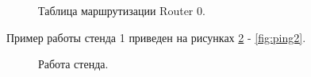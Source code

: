 \documentclass[a4paper,14pt]{article}
\begin{document}
\newpage
\begin{figure}[!h]
    \caption{Таблица маршрутизации Router 0.}
    \label{fig:table}
\end{figure}


Пример работы стенда 1 приведен на рисунках \ref{fig:ping1} - \ref{fig:ping2}.
\newpage
\begin{figure}[!h]
    \caption{Работа стенда.}
    \label{fig:ping1}
\end{figure}
\end{document}
